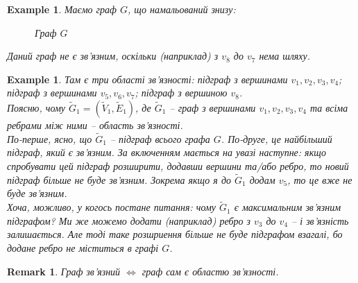 \documentclass[a4paper, 14pt]{extarticle}
\theoremstyle{theoremdd}
\theoremstyle{theoremdd}
\theoremstyle{theoremdd}
\theoremstyle{theoremdd}
\theoremstyle{theoremdd}
\newtheorem{example}[theorem]{Example}
\theoremstyle{theoremdd}
\theoremstyle{theoremdd}
\theoremstyle{theoremdd}
\theoremstyle{theoremdd}
\theoremstyle{theoremdd}
\theoremstyle{theoremdd}
\newtheorem{remark}[theorem]{Remark}
\theoremstyle{theoremdd}
\theoremstyle{theoremdd}
\theoremstyle{theoremdd}
\theoremstyle{theoremdd}
\begin{document}
\begin{example}
Маємо граф $G$, що намальований знизу:
\begin{figure}[H]
\centering
{}
\caption*{Граф $G$}
\end{figure}
Даний граф не є зв'язним, оскільки (наприклад) з $v_8$ до $v_7$ нема шляху.
\end{example}

\begin{example}
Там є три області зв'язності: підграф з вершинами $v_1,v_2,v_3,v_4$; підграф з вершинами $v_5,v_6,v_7$; підграф з вершиною $v_8$.\\
Поясню, чому $\tilde{G}_1 = (\tilde{V}_1,\tilde{E}_1)$, де $\tilde{G}_1$ -- граф з вершинами $v_1,v_2,v_3,v_4$ та всіма ребрами між ними -- область зв'язності.\\
По-перше, ясно, що $\tilde{G}_1$ -- підграф всього графа $G$. По-друге, це найбільший підграф, який є зв'язним. За включенням мається на увазі наступне: якщо спробувати цей підграф розширити, додавши вершини та/або ребро, то новий підграф більше не буде зв'язним. Зокрема якщо я до $\tilde{G}_1$ додам $v_5$, то це вже не буде зв'язним.\\
Хоча, можливо, у когось постане питання: чому $\tilde{G}_1$ є максимальним зв'язним підграфом? Ми же можемо додати (наприклад) ребро з $v_3$ до $v_4$ -- і зв'язність залишається. Але тоді таке розшриення більше не буде підграфом взагалі, бо додане ребро не міститься в графі $G$.
\end{example}

\begin{remark}
Граф зв'язний $\iff$ граф сам є областю зв'язності.
\end{remark}
\end{document}
